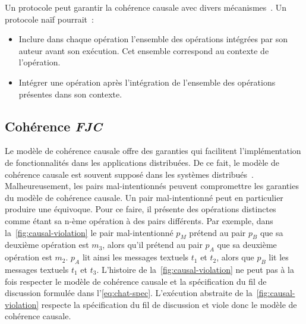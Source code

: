
Un protocole peut garantir la cohérence causale avec divers mécanismes~\autocite{lamport_1978_time,fidge_1987_timestamps,prakash_1997_barrierbarrier}.
Un protocole naïf pourrait~:

\begin{itemize}
    \item Inclure dans chaque opération l'ensemble des opérations intégrées par son auteur avant son exécution.
    Cet ensemble correspond au contexte de l'opération.
    \item Intégrer une opération après l'intégration de l'ensemble des opérations présentes dans son contexte.
\end{itemize}


\subsection{Cohérence \emph{\acl{FJC}}}


Le modèle de cohérence causale offre des garanties qui facilitent l'implémentation de fonctionnalités dans les applications distribuées.
De ce fait, le modèle de cohérence causale est souvent supposé dans les systèmes distribués~\autocite{shapiro_2011_crdt}.
Malheureusement, les pairs mal-intentionnés peuvent compromettre les garanties du modèle de cohérence causale.
Un pair mal-intentionné peut en particulier produire une équivoque.
Pour ce faire, il présente des opérations distinctes comme étant sa n-ème opération à des pairs différents.
Par exemple, dans la~\autoref{fig:causal-violation} le pair mal-intentionné $p_M$ prétend au pair $p_B$ que sa deuxième opération est $m_3$, alors qu'il prétend au pair $p_A$ que sa deuxième opération est $m_2$.
$p_A$ lit ainsi les messages textuels $t_1$ et $t_2$, alors que $p_B$ lit les messages textuels $t_1$ et $t_3$.
L'histoire de la~\autoref{fig:causal-violation} ne peut pas à la fois respecter le modèle de cohérence causale et la spécification du fil de discussion formulée dans l'\autoref{eq:chat-spec}.
L'exécution abstraite de la~\autoref{fig:causal-violation} respecte la spécification du fil de discussion et viole donc le modèle de cohérence causale.

